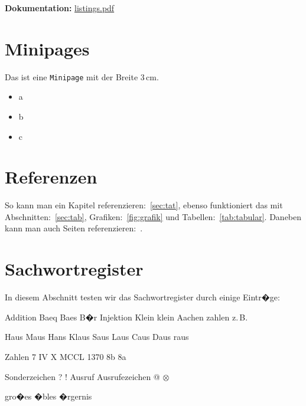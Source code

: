 \noindent\textbf{Dokumentation:} \href{http://www.ctan.org/tex-archive/macros/latex/contrib/listings/listings.pdf}{listings.pdf}


\section{Minipages}


\begin{minipage}{3cm}
\raggedright Das ist eine \texttt{Minipage} mit der Breite 3\,cm.
\begin{itemize}
\item a
\item b
\item c
\end{itemize}
\end{minipage}


\section{Referenzen}
\label{sec:ref}

So kann man ein Kapitel referenzieren:~\ref{sec:tat}, ebenso funktioniert das
mit Abschnitten:~\ref{sec:tab}, Grafiken:~\ref{fig:grafik} und
Tabellen:~\ref{tab:tabular}. Daneben kann man auch Seiten
referenzieren:~\pageref{sec:tat}.




\section{Sachwortregister} 

In diesem Abschnitt testen wir das Sachwortregister durch einige Eintr�ge:

Addition
Baeq
Baes
B�r
Injektion
Klein
klein
Aachen
zahlen
z.\,B.

Haus
Maus
Hans
Klaus
Saus
Laus
Caus
Daus
raus

Zahlen
7
IV
X
MCCL
1370
8b
8a

Sonderzeichen
?
!\index{+!}
Ausruf
Ausrufezeichen
@
$\otimes$\index{$\otimes$}

gro�es �bles �rgernis

